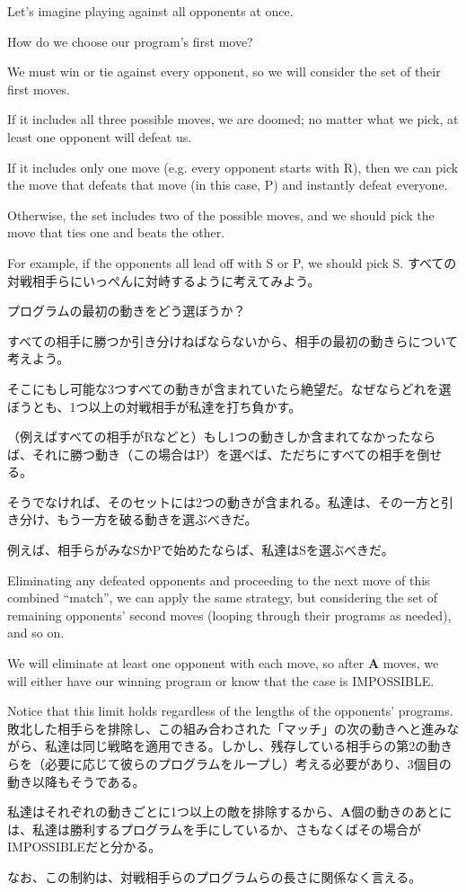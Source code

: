 \documentclass[uplatex,dvipdfmx]{jsarticle} \usepackage{amsmath,amssymb,bm}
\begin{document}
\begin{paracol}{2}
Let's imagine playing against all opponents at once.

How do we choose our program's first move?

We must win or tie against every opponent, so we will consider the set of their first moves.

If it includes all three possible moves, we are doomed; no matter what we pick, at least one opponent will defeat us.

If it includes only one move (e.g. every opponent starts with R), then we can pick the move that defeats that move (in this case, P) and instantly defeat everyone.

Otherwise, the set includes two of the possible moves, and we should pick the move that ties one and beats the other.

For example, if the opponents all lead off with S or P, we should pick S.
\switchcolumn
すべての対戦相手らにいっぺんに対峙するように考えてみよう。

プログラムの最初の動きをどう選ぼうか？

すべての相手に勝つか引き分けねばならないから、相手の最初の動きらについて考えよう。

そこにもし可能な3つすべての動きが含まれていたら絶望だ。なぜならどれを選ぼうとも、1つ以上の対戦相手が私達を打ち負かす。

（例えばすべての相手がRなどと）もし1つの動きしか含まれてなかったならば、それに勝つ動き（この場合はP）を選べば、ただちにすべての相手を倒せる。

そうでなければ、そのセットには2つの動きが含まれる。私達は、その一方と引き分け、もう一方を破る動きを選ぶべきだ。

例えば、相手らがみなSかPで始めたならば、私達はSを選ぶべきだ。
\end{paracol}
\vspace{\baselineskip}
\begin{paracol}{2}
Eliminating any defeated opponents and proceeding to the next move of this combined ``match'', we can apply the same strategy, but considering the set of remaining opponents' second moves (looping through their programs as needed), and so on.

We will eliminate at least one opponent with each move, so after $\mathbf{A}$ moves, we will either have our winning program or know that the case is IMPOSSIBLE.

Notice that this limit holds regardless of the lengths of the opponents' programs.
\switchcolumn
敗北した相手らを排除し、この組み合わされた「マッチ」の次の動きへと進みながら、私達は同じ戦略を適用できる。しかし、残存している相手らの第2の動きらを（必要に応じて彼らのプログラムをループし）考える必要があり、3個目の動き以降もそうである。

私達はそれぞれの動きごとに1つ以上の敵を排除するから、$\mathbf{A}$個の動きのあとには、私達は勝利するプログラムを手にしているか、さもなくばその場合がIMPOSSIBLEだと分かる。

なお、この制約は、対戦相手らのプログラムらの長さに関係なく言える。
\end{paracol}
\end{document}
